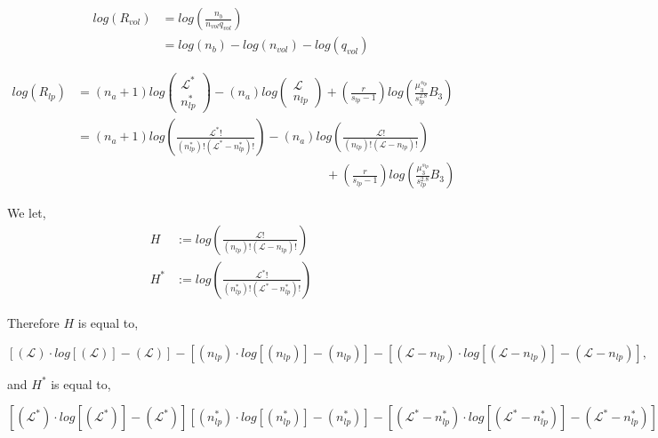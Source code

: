 \documentclass[12pt,letterpaper]{article}
\newcommand{\leng}{\mathcal{L}}
\newcommand{\lr}[1]{\left( #1 \right)}
\newcommand{\lrb}[1]{\left[ #1 \right]}
\newcommand{\stirl}[1]{
    \ensuremath{
        \left(
            #1
        \right)
        \cdotp 
        log
        \left[
            \left(
            #1
            \right)
        \right]
        -
        \left(
            #1
        \right)
    }
}
\newcommand{\facto}[2]{
    \ensuremath{
        \frac{
        #1!
        }{
        \lr{
        #2
        }!
        \lr{
        #1
        -
        #2
        }!
        }
    }
}
\begin{document}
\begin{align}
     log
     \lr{
        R_{vol}
    }
    &=
    log
    \lr{
    	\frac{
		    n_b
		}{
		    n_{vol} q_{vol}
		}
    }\\
    &=
    log
    \lr{
        n_b
    }
    -
    log
    \lr{
        n_{vol}
    }
    -
    log
    \lr{
        q_{vol}
    }    
\end{align}

\begin{align}
\label{eq.LogRvol1}
log
\lr{
    R_{lp}
}
&=
\lr{n_a+1}   
log
\lr{
    \begin{array}{c}
    \leng^{*}\\
    n_{lp}^{*} 
    \end{array}
}
-
\lr{n_a}
log
\lr{
\begin{array}{c}
     \leng\\
     n_{lp}
\end{array}
}
+
\lr{
    \frac{
        r
    }{
        s_{lp}-1
    }
}
log
\lr{
    \frac{
        \mu_3^{
            s_{lp}
        }
    }{
        s_{lp}^{2.8}
    }
    B_3
}
\nonumber\\
&=
\lr{n_a+1}   
log
\lr{
    \facto{
        \leng^{*}
    }{
        n_{lp}^{*}
    }
}
-
\lr{n_a}
log
\lr{
    \facto{
        \leng
    }{
        n_{lp}
    }
}
\\
&\qquad\qquad\qquad
\qquad\qquad\qquad
\qquad\qquad\qquad
\qquad
+
\lr{
    \frac{
        r
    }{
        s_{lp}-1
    }
}
log
\lr{
    \frac{
        \mu_3^{
            s_{lp}
        }
    }{
        s_{lp}^{2.8}
    }
    B_3
}\nonumber
\end{align}

We let, 
\begin{align}
H&:=
log
\lr{
\facto{
    \leng
}{
    n_{lp}
}
}\\
H^{*}
&:=
log
\lr{
\facto{
    \leng^{*}
}{
    n_{lp}^{*}
}
}
\end{align}

Therefore $H$ is equal to,

\begin{equation}
\lrb{
    \stirl{
        \leng
    }
}
-
\lrb{
    \stirl{
        n_{lp}
    }
}
-
\lrb{
    \stirl{
        \leng
        -
        n_{lp}
    }
},
\end{equation}

and $H^*$ is equal to,

\begin{equation}
\lrb{
    \stirl{
        \leng^{*}
    }
}
\lrb{
    \stirl{
        n_{lp}^{*}
    }
}
-
\lrb{
    \stirl{
        \leng^{*}
        -
        n_{lp}^{*}
    }
}
\end{equation}
\end{document}
